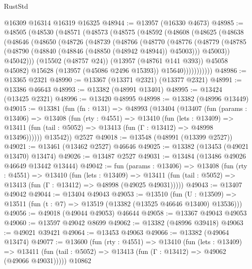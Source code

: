 \begin{lexlean}{RustStd}
\begin{coremodule}
    @16309
    @16314
    @16319
    @16325
@48944 := @13957 (@16330 @4673)
@48985 := @48505
    (@48530
      (@48571
        (@48573
          (@48575
            (@48592
              (@48608
                (@48625
                  (@48638
                    (@48646
                      (@48650
                        (@48726
                          (@48739
                            (@48766
                              (@48770
                                (@48776
                                  (@48779
                                    (@48785
                                      (@48790 (@48840 (@48846 (@48850 (@48942 @48944)) @45003)))
                                      @45003))
                                  @45042)))
                            (@15502 (@48757 @24))
                            (@13957 (@48761 @141 @393))
                            @45058
                            @45082)
                          @15628
                          (@13957 (@45086 @2496 @15393))
                          @15640)))))))))))
@48986 := @13365 @2321
@48990 := @13367 (@13371 @2321) (@13377 @2321)
@48991 := @13386 @46643
@48993 := @13382 (@48991 @13401)
@48995 := @13424 (@13425 @2321)
@48996 := @13420 @48995
@48998 := @13382 (@48996 @13449)
@49015 := @13381
    (fun (fn : @131) =>
    @48993
      (@13404
        (@13407
          (fun (params : @13406) =>
          @13408
            (fun (rty : @4551) =>
            @13410
              (fun (lets : @13409) =>
              @13411 (fun (tail : @5052) => @13413 (fun (Γ : @13412) => @48998 @13496))))))
        @13542))
    @2527
@49018 := @13548 (@48991 (@13399 @2527))
@49021 := @13461 (@13462 @2527) @46646
@49025 := @13382 (@13453 (@49021 @13470) @13474)
@49026 := @13487 @2527
@49031 := @13484 (@13486 @49026 @46649 @13442 @13444)
@49042 := fun (params : @13406) =>
  @13408
    (fun (rty : @4551) =>
    @13410
      (fun (lets : @13409) =>
      @13411 (fun (tail : @5052) => @13413 (fun (Γ : @13412) => @48998 (@49025 @49031)))))
@49043 := @13407 @49042
@49044 := @13404 @49043
@49053 := @13510
    (fun (U : @13509) => @13511 (fun (t : @7) => @13519 (@13382 (@13525 @46646 @13400) @13536)))
@49056 := @49018 (@49044 @49053) @46644
@49058 := @13367 @49043 @49053
@49060 := @13597 @49042 @8699
@49062 := @13382 (@48996 @39418)
@49063 := @49021 @39421
@49064 := @13453 @49063
@49066 := @13382 (@49064 @13474)
@49077 := @13600
    (fun (rty : @4551) =>
    @13410
      (fun (lets : @13409) =>
      @13411 (fun (tail : @5052) => @13413 (fun (Γ : @13412) => @49062 (@49066 @49031)))))
    @10862

\end{coremodule}
\end{lexlean}
